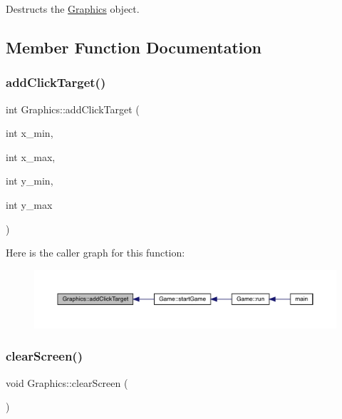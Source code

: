 Destructs the \mbox{\hyperlink{class_graphics}{Graphics}} object. 

\subsection{Member Function Documentation}
\mbox{\label{class_graphics_acf2ad5a746e2cdb9c16dd742b1455603}} 
\subsubsection{\texorpdfstring{add\+Click\+Target()}{addClickTarget()}}
{\footnotesize\ttfamily int Graphics\+::add\+Click\+Target (\begin{DoxyParamCaption}\item[{int}]{x\+\_\+min,  }\item[{int}]{x\+\_\+max,  }\item[{int}]{y\+\_\+min,  }\item[{int}]{y\+\_\+max }\end{DoxyParamCaption})}

Here is the caller graph for this function\+:\nopagebreak
\begin{figure}[H]
\begin{center}
\leavevmode
\includegraphics[width=350pt]{class_graphics_acf2ad5a746e2cdb9c16dd742b1455603_icgraph}
\end{center}
\end{figure}
\mbox{\label{class_graphics_a68beb512b0697952ebafce249c86dbd3}} 
\subsubsection{\texorpdfstring{clear\+Screen()}{clearScreen()}}
{\footnotesize\ttfamily void Graphics\+::clear\+Screen (\begin{DoxyParamCaption}{ }\end{DoxyParamCaption})}

